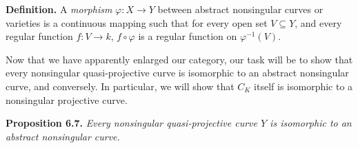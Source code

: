 {\medskip
\noindent\textbf{Definition.} A \emph{morphism} $\varphi\colon X\to Y$ between abstract nonsingular curves or varieties is a continuous mapping such that for every open set $V\subseteq Y$, and every regular function $f\colon V\to k$, $f\circ\varphi$ is a regular function on $\varphi^{-1}(V)$.

\medskip
Now that we have apparently enlarged our category, our task will be to show that every nonsingular quasi-projective curve is isomorphic to an abstract nonsingular curve, and conversely. In particular, we will show that $C_K$ itself is isomorphic to a nonsingular projective curve.

\medskip
\noindent\hypertarget{result-I-6.7}{}\textbf{Proposition 6.7.} \emph{Every nonsingular quasi-projective curve $Y$ is isomorphic to an abstract nonsingular curve.}}
